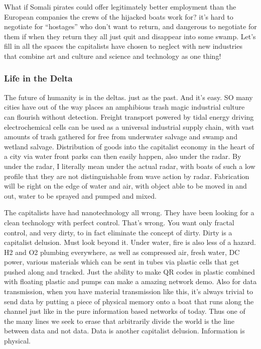 What if Somali pirates could offer legitimately better employment than
the European companies the crews of the hijacked boats work for? it's
hard to negotiate for ``hostages'' who don't want to return, and
dangerous to negotiate for them if when they return they all just quit
and disappear into some swamp. Let's fill in all the spaces the
capitalists have chosen to neglect with new industries that combine art
and culture and science and technology as one thing!

\subsubsection{Life in the Delta}\label{life-in-the-delta}

The future of humanity is in the deltas. just as the past. And it's
easy. SO many cities have out of the way places an amphibious trash
magic industrial culture can flourish without detection. Freight
transport powered by tidal energy driving electrochemical cells can be
used as a universal industrial supply chain, with vast amounts of trash
gathered for free from underwater salvage and swamp and wetland salvage.
Distribution of goods into the capitalist economy in the heart of a city
via water front parks can then easily happen, also under the radar. By
under the radar, I literally mean under the actual radar, with boats of
such a low profile that they are not distinguishable from wave action by
radar. Fabrication will be right on the edge of water and air, with
object able to be moved in and out, water to be sprayed and pumped and
mixed.

The capitalists have had nanotechnology all wrong. They have been
looking for a clean technology with perfect control. That's wrong. You
want only fractal control, and very dirty, to in fact eliminate the
concept of dirty. Dirty is a capitalist delusion. Must look beyond it.
Under water, fire is also less of a hazard. H2 and O2 plumbing
everywhere, as well as compressed air, fresh water, DC power, various
materials which can be sent in tubes via plastic cells that get pushed
along and tracked. Just the ability to make QR codes in plastic combined
with floating plastic and pumps can make a amazing network demo. Also
for data transmission, when you have material transmission like this,
it's always trivial to send data by putting a piece of physical memory
onto a boat that runs along the channel just like in the pure
information based networks of today. Thus one of the many lines we seek
to erase that arbitrarily divide the world is the line between data and
not data. Data is another capitalist delusion. Information is physical.

